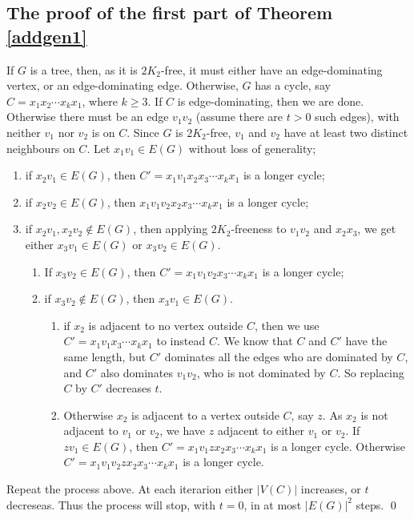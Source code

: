 \documentclass{amsart}
\theoremstyle{definition}
\begin{document}
\subsection{The proof of the first part of Theorem \ref{addgen1}}
If $G$ is a tree, then, as it is $2K_2$-free, it must either have an edge-dominating
vertex, or an edge-dominating edge.
Otherwise, $G$ has a cycle, say $C=x_1x_2\cdots x_kx_1$, where $k\ge3$.
If $C$ is edge-dominating, then we are done. 
Otherwise
there must be an edge $v_1v_2$ (assume there are $t>0$ such edges), 
with neither $v_1$ nor $v_2$ is on $C$. 
Since $G$ is $2K_2$-free, $v_1$ and $v_2$ have at least two distinct neighbours on $C$. 
Let $x_1v_1\in E(G)$ without loss of generality; 
\begin{enumerate}
\item if $x_2v_1\in E(G)$, then $C'=x_1v_1x_2x_3\cdots x_kx_1$ is a longer cycle;
\item if $x_2v_2\in E(G)$, then $x_1v_1v_2x_2x_3\cdots x_kx_1$ is a longer cycle; 
\item if $x_2v_1,x_2v_2\not\in E(G)$, then applying $2K_2$-freeness to $v_1v_2$ and $x_2x_3$, 
we get either $x_3v_1\in E(G)$ or $x_3v_2\in E(G)$.
\begin{enumerate}
\item If $x_3v_2\in E(G)$, then $C'=x_1v_1v_2x_3\cdots x_kx_1$ is a longer cycle;
\item if $x_3v_2\not\in E(G)$, then $x_3v_1\in E(G)$.
\begin{enumerate}
\item if $x_2$ is adjacent to no vertex outside $C$, then we use $C'=x_1v_1x_3\cdots x_kx_1$ to instead $C$. We know that $C$ and $C'$ have the same length, but $C'$ dominates all the edges who are dominated by $C$, and $C'$ also dominates $v_1v_2$, who is not dominated by $C$. So replacing $C$ by $C'$
decreases $t$.
\item Otherwise $x_2$ is adjacent to a vertex outside $C$, say $z$.
As $x_2$ is not adjacent to $v_1$ or $v_2$, we have $z$ adjacent to either $v_1$ or $v_2$. If $zv_1\in E(G)$, then $C'=x_1v_1zx_2x_3\cdots x_kx_1$ is a longer cycle.
Otherwise $C'=x_1v_1v_2zx_2x_3\cdots x_kx_1$ is a longer cycle.
\end{enumerate}
\end{enumerate}
\end{enumerate}
Repeat the process above. At each iterarion either $|V(C)|$ increases, or $t$ decreseas.
Thus the process will stop, with $t=0$, in at most $|E(G)|^2$ steps. 
\qed
\end{document}
